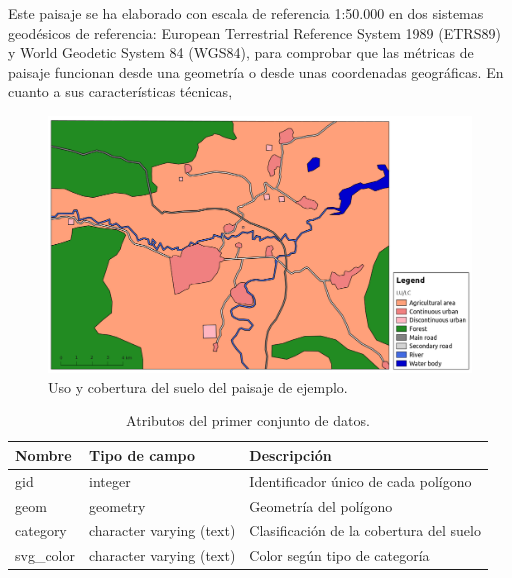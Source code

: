Este paisaje se ha elaborado con escala de referencia 1:50.000 en dos sistemas geodésicos de referencia: European Terrestrial Reference System 1989 (ETRS89) y World Geodetic System 84 (WGS84), para comprobar que las métricas de paisaje funcionan desde una geometría o desde unas coordenadas geográficas. En cuanto a sus características técnicas, 



\begin{figure}
\begin{center}
\includegraphics[width=\textwidth]{Metodologia/Figs/land_test.png}
\caption{Uso y cobertura del suelo del paisaje de ejemplo. \label{fig:lan_test}}
\end{center}
\end{figure}

\begin{table}[]
\centering
\caption{Atributos del primer conjunto de datos.}
\label{my-label}
\begin{tabular}{@{}lll@{}}
\toprule
\textbf{Nombre} & \textbf{Tipo de campo}   & \textbf{Descripción}                    \\ \midrule
gid             & integer                  & Identificador único de cada polígono    \\
geom            & geometry                 & Geometría del polígono                  \\
category        & character varying (text) & Clasificación de la cobertura del suelo \\
svg\_color      & character varying (text) & Color según tipo de categoría           \\ \bottomrule
\end{tabular}
\end{table}




